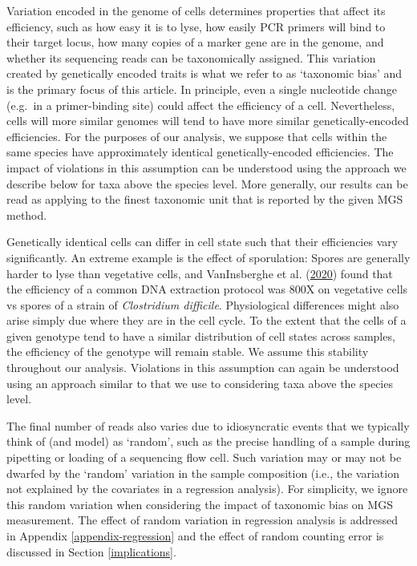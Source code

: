 \documentclass[
]{article}
\begin{document}
Variation encoded in the genome of cells determines properties that affect its efficiency, such as how easy it is to lyse, how easily PCR primers will bind to their target locus, how many copies of a marker gene are in the genome, and whether its sequencing reads can be taxonomically assigned.
This variation created by genetically encoded traits is what we refer to as `taxonomic bias' and is the primary focus of this article.
In principle, even a single nucleotide change (e.g.~in a primer-binding site) could affect the efficiency of a cell.
Nevertheless, cells will more similar genomes will tend to have more similar genetically-encoded efficiencies.
For the purposes of our analysis, we suppose that cells within the same species have approximately identical genetically-encoded efficiencies.
The impact of violations in this assumption can be understood using the approach we describe below for taxa above the species level.
More generally, our results can be read as applying to the finest taxonomic unit that is reported by the given MGS method.

Genetically identical cells can differ in cell state such that their efficiencies vary significantly.
An extreme example is the effect of sporulation: Spores are generally harder to lyse than vegetative cells, and VanInsberghe et al. (\protect\hyperlink{ref-vaninsberghe2020diar}{2020}) found that the efficiency of a common DNA extraction protocol was 800X on vegetative cells vs spores of a strain of \emph{Clostridium difficile}.
Physiological differences might also arise simply due where they are in the cell cycle.
To the extent that the cells of a given genotype tend to have a similar distribution of cell states across samples, the efficiency of the genotype will remain stable.
We assume this stability throughout our analysis.
Violations in this assumption can again be understood using an approach similar to that we use to considering taxa above the species level.

The final number of reads also varies due to idiosyncratic events that we typically think of (and model) as `random', such as the precise handling of a sample during pipetting or loading of a sequencing flow cell.
Such variation may or may not be dwarfed by the `random' variation in the sample composition (i.e., the variation not explained by the covariates in a regression analysis).
For simplicity, we ignore this random variation when considering the impact of taxonomic bias on MGS measurement.
The effect of random variation in regression analysis is addressed in Appendix
\ref{appendix-regression} and the effect of random counting error is discussed in Section \ref{implications}.
\end{document}
